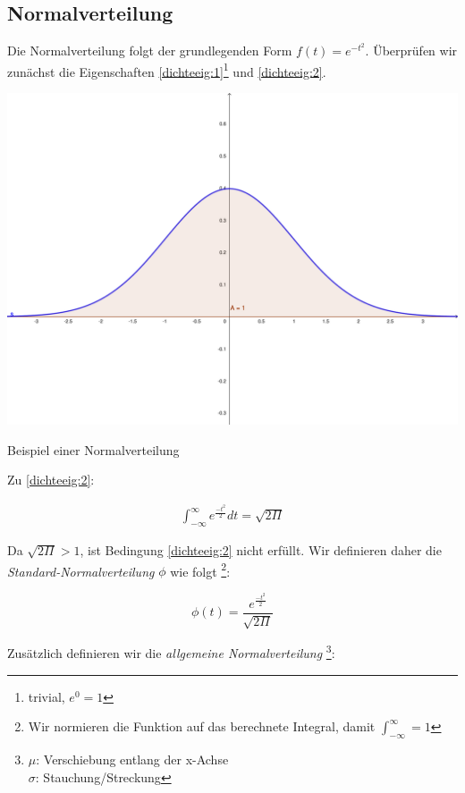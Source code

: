 \documentclass{tufte-handout}
\theoremstyle{own}
\begin{document}
\subsection{Normalverteilung}

Die Normalverteilung folgt der grundlegenden Form $f(t) = e^{- t^2}$. Überprüfen wir zunächst
die Eigenschaften \eqref{dichteeig:1}\footnote{trivial, $e^0 = 1$} und \eqref{dichteeig:2}.

\begin{marginfigure}
	\includegraphics{normalverteilung}
	\caption{Beispiel einer Normalverteilung}
\end{marginfigure}

Zu \eqref{dichteeig:2}:

\begin{gather*}
	\int_{-\infty}^\infty e^{\frac{- t^2}{2}} dt = \sqrt{2 \Pi}
\end{gather*}

Da $\sqrt{2\Pi} > 1$, ist Bedingung \eqref{dichteeig:2} nicht erfüllt. Wir definieren daher die \textit{Standard-Normalverteilung} $\phi$ wie folgt
\footnote{Wir normieren die Funktion auf das berechnete Integral, damit $\int_{-\infty}^\infty = 1$}:

\begin{equation}
\phi(t) = \frac{e^{\frac{-t^2}{2}}}{\sqrt{2 \Pi}}
\end{equation}

Zusätzlich definieren wir die \textit{allgemeine Normalverteilung}
\footnote{
$\mu$: Verschiebung entlang der x-Achse \\
$\sigma$: Stauchung/Streckung}:
\end{document}
